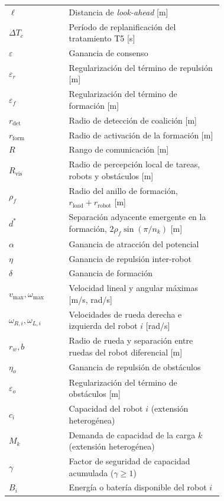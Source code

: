 \begin{longtable}{@{}l@{\hskip 2em}>{\raggedright\arraybackslash}p{0.72\linewidth}@{}}
$\ell$                  & Distancia de \emph{look-ahead} [m] \\
$\Delta T_c$            & Período de replanificación del tratamiento T5 [s] \\
$\varepsilon$           & Ganancia de consenso \\
$\varepsilon_r$         & Regularización del término de repulsión [m] \\
$\varepsilon_f$         & Regularización del término de formación [m] \\
$r_{\mathrm{det}}$      & Radio de detección de coalición [m] \\
$r_{\mathrm{form}}$     & Radio de activación de la formación [m] \\
$R$                     & Rango de comunicación [m] \\
$R_{\mathrm{vis}}$      & Radio de percepción local de tareas, robots y obstáculos [m] \\
$\rho_f$                & Radio del anillo de formación, $r_{\mathrm{load}}+r_{\mathrm{robot}}$ [m] \\
$d^*$                   & Separación adyacente emergente en la formación, $2\rho_f\sin(\pi/n_k)$ [m] \\
$\alpha$                & Ganancia de atracción del potencial \\
$\eta$                  & Ganancia de repulsión inter-robot \\
$\delta$                & Ganancia de formación \\
$v_{\max},\omega_{\max}$ & Velocidad lineal y angular máximas [m/s, rad/s] \\
$\omega_{R,i},\omega_{L,i}$ & Velocidades de rueda derecha e izquierda del robot $i$ [rad/s] \\
$r_w,b$                 & Radio de rueda y separación entre ruedas del robot diferencial [m] \\
$\eta_o$                & Ganancia de repulsión de obstáculos \\
$\varepsilon_o$         & Regularización del término de obstáculos [m] \\
$c_i$                   & Capacidad del robot $i$ (extensión heterogénea) \\
$M_k$                   & Demanda de capacidad de la carga $k$ (extensión heterogénea) \\
$\gamma$                & Factor de seguridad de capacidad acumulada ($\gamma\geq1$) \\
$B_i$                   & Energía o batería disponible del robot $i$ \\

\end{longtable}
